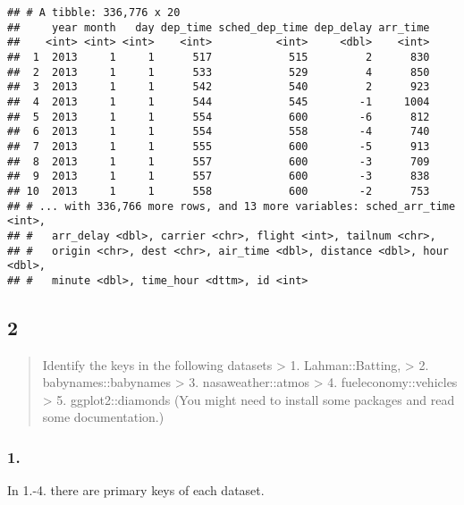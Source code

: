 \documentclass[]{ltjsarticle}
\newenvironment{Shaded}{\begin{snugshade}}{\end{snugshade}}
\newcommand{\CommentTok}[1]{\textcolor[rgb]{0.56,0.35,0.01}{\textit{#1}}}
\newcommand{\DataTypeTok}[1]{\textcolor[rgb]{0.13,0.29,0.53}{#1}}
\newcommand{\DecValTok}[1]{\textcolor[rgb]{0.00,0.00,0.81}{#1}}
\newcommand{\KeywordTok}[1]{\textcolor[rgb]{0.13,0.29,0.53}{\textbf{#1}}}
\newcommand{\NormalTok}[1]{#1}
\newcommand{\OperatorTok}[1]{\textcolor[rgb]{0.81,0.36,0.00}{\textbf{#1}}}
\newcommand{\StringTok}[1]{\textcolor[rgb]{0.31,0.60,0.02}{#1}}
\begin{document}
\begin{verbatim}
## # A tibble: 336,776 x 20
##     year month   day dep_time sched_dep_time dep_delay arr_time
##    <int> <int> <int>    <int>          <int>     <dbl>    <int>
##  1  2013     1     1      517            515         2      830
##  2  2013     1     1      533            529         4      850
##  3  2013     1     1      542            540         2      923
##  4  2013     1     1      544            545        -1     1004
##  5  2013     1     1      554            600        -6      812
##  6  2013     1     1      554            558        -4      740
##  7  2013     1     1      555            600        -5      913
##  8  2013     1     1      557            600        -3      709
##  9  2013     1     1      557            600        -3      838
## 10  2013     1     1      558            600        -2      753
## # ... with 336,766 more rows, and 13 more variables: sched_arr_time <int>,
## #   arr_delay <dbl>, carrier <chr>, flight <int>, tailnum <chr>,
## #   origin <chr>, dest <chr>, air_time <dbl>, distance <dbl>, hour <dbl>,
## #   minute <dbl>, time_hour <dttm>, id <int>
\end{verbatim}

\hypertarget{section-7}{%
\subsection{2}\label{section-7}}

\begin{quote}
Identify the keys in the following datasets \textgreater{} 1.
Lahman::Batting, \textgreater{} 2. babynames::babynames \textgreater{}
3. nasaweather::atmos \textgreater{} 4. fueleconomy::vehicles
\textgreater{} 5. ggplot2::diamonds (You might need to install some
packages and read some documentation.)
\end{quote}

\hypertarget{section-8}{%
\subsubsection{1.}\label{section-8}}

In 1.-4. there are primary keys of each dataset.

\begin{Shaded}
\end{Shaded}
\end{document}
